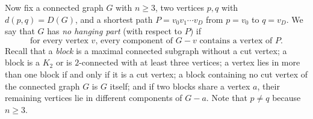 \documentclass[11pt]{article}
\theoremstyle{definition}
\theoremstyle{remark}
\newcommand{\D}{D}
\begin{document}
Now fix a connected graph $G$ with $n\ge3$, two vertices $p,q$ with $d(p,q)=\D(G)$, and a
shortest path $P=v_0v_1\cdots v_\D$ from $p=v_0$ to $q=v_\D$. We say that $G$ has \emph{no
hanging part} (with respect to $P$) if
\begin{equation}\label{eq:H}
 \text{for every vertex $v$, every component of $G-v$ contains a vertex of $P$.}\tag{H}
\end{equation}
Recall that a \emph{block} is a maximal connected subgraph without a cut vertex; a block is a
$K_2$ or is $2$-connected with at least three vertices; a vertex lies in more than one block
if and only if it is a cut vertex; a block containing no cut vertex of the connected graph $G$
is $G$ itself; and if two blocks share a vertex $a$, their remaining vertices lie in different
components of $G-a$. Note that $p\ne q$ because $n\ge3$.
\end{document}
